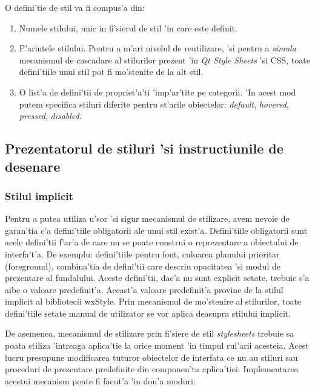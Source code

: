 \medskip

O defini'tie de stil va fi compus'a din:
\begin{enumerate}
\item Numele stilului, unic in fi'sierul de stil 'in care este definit.
\item P'arintele stilului. Pentru a m'ari nivelul de reutilizare, 'si pentru a \emph{simula} mecanismul de cascadare al stilurilor prezent 'in \emph{Qt Style Sheets} 'si CSS, toate defini'tiile unui stil pot fi mo'stenite de la alt stil.
\item O list'a de defini'tii de propriet'a'ti 'imp'ar'tite pe categorii. 'In acest mod putem specifica stiluri diferite pentru st'arile obiectelor: \emph{default}, \emph{hovered}, \emph{pressed}, \emph{disabled}.
\end{enumerate}

\subsection{Prezentatorul de stiluri 'si instructiunile de desenare}

\subsubsection{Stilul implicit}
Pentru a putea utiliza u'sor 'si sigur mecanismul de stilizare, avem nevoie de garan'tia c'a defini'tiile obligatorii ale unui stil exist'a. Defini'tiile obligatorii sunt acele defini'tii f'ar'a de care nu se poate construi o reprezentare a obiectului de interfa't'a. De exemplu: defini'tiile pentru font, culoarea planului prioritar (foreground), combina'tia de defini'tii care descriu opacitatea 'si modul de prezentare al fundalului. Aceste defini'tii, dac'a nu sunt explicit setate, trebuie s'a aibe o valoare predefinit'a. Aceast'a valoare predefinit'a provine de la stilul implicit al bibliotecii wxStyle. Prin mecanismul de mo'stenire al stilurilor, toate defini'tiile setate manual de utilizator se vor aplica deasupra stilului implicit. 

\medskip

De asemenea, mecanismul de stilizare prin fi'siere de stil \emph{stylesheets} trebuie sa poata stiliza 'intreaga aplica'tie la orice moment 'in timpul rul'arii acesteia. Acest lucru presupune modificarea tuturor obiectelor de interfata ce nu au stiluri sau proceduri de prezentare predefinite din componen'ta aplica'tiei. Implementarea acestui mecanism poate fi facut'a 'in dou'a moduri:

